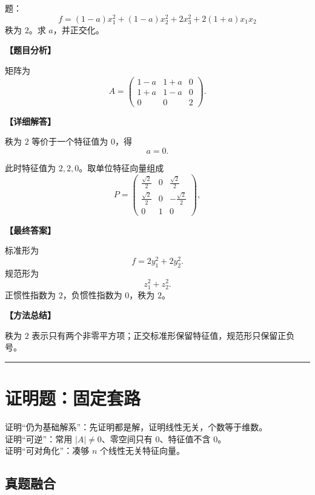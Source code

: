 ﻿\documentclass[11pt,a4paper,UTF8]{ctexart}
\begin{document}
\begin{answerbox}
题：
\[f=(1-a)x_1^2+(1-a)x_2^2+2x_3^2+2(1+a)x_1x_2\]
秩为 $2$。求 $a$，并正交化。

\textbf{【题目分析】}

矩阵为
\[A=\begin{pmatrix}1-a&1+a&0\\1+a&1-a&0\\0&0&2\end{pmatrix}.\]

\textbf{【详细解答】}

秩为 $2$ 等价于一个特征值为 $0$，得
\[a=0.\]

此时特征值为 $2,2,0$。取单位特征向量组成
\[
P=\begin{pmatrix}
\frac{\sqrt2}{2}&0&\frac{\sqrt2}{2}\\
\frac{\sqrt2}{2}&0&-\frac{\sqrt2}{2}\\
0&1&0
\end{pmatrix},
\]

\textbf{【最终答案】}

标准形为
\[f=2y_1^2+2y_2^2.\]
规范形为
\[
z_1^2+z_2^2.
\]
正惯性指数为 \(2\)，负惯性指数为 \(0\)，秩为 \(2\)。

\textbf{【方法总结】}

秩为 \(2\) 表示只有两个非零平方项；正交标准形保留特征值，规范形只保留正负号。
\end{answerbox}
\bigskip\hrule\bigskip

\section{证明题：固定套路}

\begin{identifybox}[高亮公式]
证明“仍为基础解系”：先证明都是解，证明线性无关，个数等于维数。\\
证明“可逆”：常用 $|A|\ne0$、零空间只有 $0$、特征值不含 $0$。\\
证明“可对角化”：凑够 $n$ 个线性无关特征向量。\\
\end{identifybox}

\subsection{真题融合}
\end{document}
